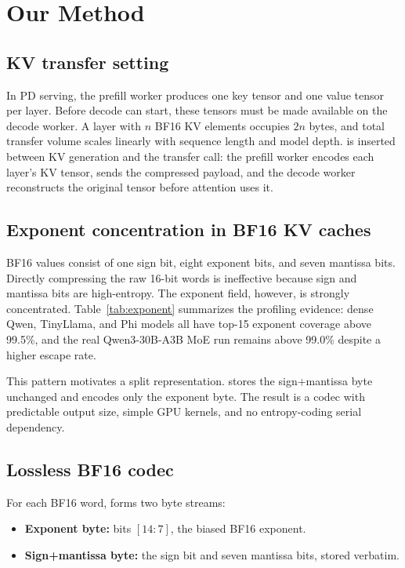 \section{Our Method}
\label{sec:method}

\subsection{KV transfer setting}

In PD serving, the prefill worker produces one key tensor and one value tensor per layer. Before decode can start, these tensors must be made available on the decode worker. A layer with $n$ BF16 KV elements occupies $2n$ bytes, and total transfer volume scales linearly with sequence length and model depth. \splitzip is inserted between KV generation and the transfer call: the prefill worker encodes each layer's KV tensor, sends the compressed payload, and the decode worker reconstructs the original tensor before attention uses it.

\subsection{Exponent concentration in BF16 KV caches}
\label{sec:exponent}

BF16 values consist of one sign bit, eight exponent bits, and seven mantissa bits. Directly compressing the raw 16-bit words is ineffective because sign and mantissa bits are high-entropy. The exponent field, however, is strongly concentrated. Table~\ref{tab:exponent} summarizes the profiling evidence: dense Qwen, TinyLlama, and Phi models all have top-15 exponent coverage above 99.5\%, and the real Qwen3-30B-A3B MoE run remains above 99.0\% despite a higher escape rate.



This pattern motivates a split representation. \splitzip stores the sign+mantissa byte unchanged and encodes only the exponent byte. The result is a codec with predictable output size, simple GPU kernels, and no entropy-coding serial dependency.

\subsection{Lossless BF16 codec}
\label{sec:bf16-codec}

For each BF16 word, \splitzip forms two byte streams:
\begin{itemize}[nosep,leftmargin=*]
\item \textbf{Exponent byte:} bits $[14:7]$, the biased BF16 exponent.
\item \textbf{Sign+mantissa byte:} the sign bit and seven mantissa bits, stored verbatim.
\end{itemize}

